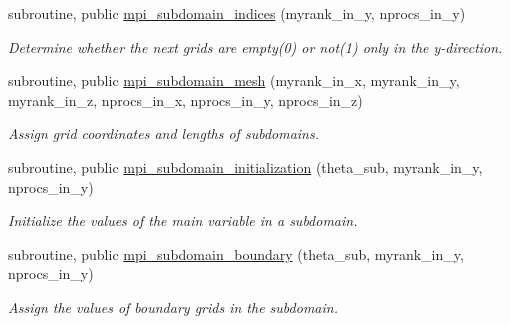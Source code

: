 \begin{DoxyCompactItemize}
subroutine, public \hyperlink{namespacempi__subdomain_afe948dc18da021f2448cf9a6265155fe}{mpi\+\_\+subdomain\+\_\+indices} (myrank\+\_\+in\+\_\+y, nprocs\+\_\+in\+\_\+y)
\begin{DoxyCompactList}\small\item\em Determine whether the next grids are empty(0) or not(1) only in the y-\/direction. \end{DoxyCompactList}\item 
subroutine, public \hyperlink{namespacempi__subdomain_a612331eead74041f174ece9a572c7427}{mpi\+\_\+subdomain\+\_\+mesh} (myrank\+\_\+in\+\_\+x, myrank\+\_\+in\+\_\+y, myrank\+\_\+in\+\_\+z, nprocs\+\_\+in\+\_\+x, nprocs\+\_\+in\+\_\+y, nprocs\+\_\+in\+\_\+z)
\begin{DoxyCompactList}\small\item\em Assign grid coordinates and lengths of subdomains. \end{DoxyCompactList}\item 
subroutine, public \hyperlink{namespacempi__subdomain_a7cc0deb85b84358eb7addeea849733c4}{mpi\+\_\+subdomain\+\_\+initialization} (theta\+\_\+sub, myrank\+\_\+in\+\_\+y, nprocs\+\_\+in\+\_\+y)
\begin{DoxyCompactList}\small\item\em Initialize the values of the main variable in a subdomain. \end{DoxyCompactList}\item 
subroutine, public \hyperlink{namespacempi__subdomain_a55659431068678c08d21847338390ea8}{mpi\+\_\+subdomain\+\_\+boundary} (theta\+\_\+sub, myrank\+\_\+in\+\_\+y, nprocs\+\_\+in\+\_\+y)
\begin{DoxyCompactList}\small\item\em Assign the values of boundary grids in the subdomain. \end{DoxyCompactList}\end{DoxyCompactItemize}
